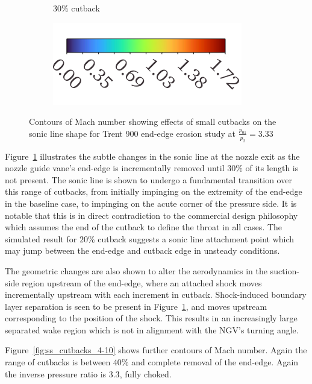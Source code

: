 \documentclass[a4paper, 11pt, oneside]{report}
\begin{document}
\begin{figure}[H]
\begin{subfigure}{.42\textwidth}
		\caption{$30\%$ cutback}
	\end{subfigure}
	\begin{subfigure}{.4\textwidth}
		\centering
		\includegraphics[width=\linewidth]{figs/mach_legend_choked_horizontal.png}
	\end{subfigure}
	\caption{Contours of Mach number showing effects of small cutbacks on the sonic line shape for Trent 900 end-edge erosion study at $\frac{p_{01}}{p_2}=3.33$}
	\label{fig:ss_cutbacks_0-3}
\end{figure}

Figure~\ref{fig:ss_cutbacks_0-3} illustrates the subtle changes in the sonic line at the nozzle exit as the nozzle guide vane's end-edge is incrementally removed until $30\%$ of its length is not present. The sonic line is shown to undergo a fundamental transition over this range of cutbacks, from initially impinging on the extremity of the end-edge in the baseline case, to impinging on the acute corner of the pressure side. It is notable that this is in direct contradiction to the commercial design philosophy which assumes the end of the cutback to define the throat in all cases. The simulated result for $20\%$ cutback suggests a sonic line attachment point which may jump between the end-edge and cutback edge in unsteady conditions.

The geometric changes are also shown to alter the aerodynamics in the suction-side region upstream of the end-edge, where an attached shock moves incrementally upstream with each increment in cutback. Shock-induced boundary layer separation is seen to be present in Figure~\ref{fig:ss_cutbacks_0-3}, and moves upstream corresponding to the position of the shock. This results in an increasingly large separated wake region which is not in alignment with the NGV's turning angle.

Figure~\ref{fig:ss_cutbacks_4-10} shows further contours of Mach number. Again the range of cutbacks is between $40\%$ and complete removal of the end-edge. Again the inverse pressure ratio is $3.3$, fully choked.
\end{document}

